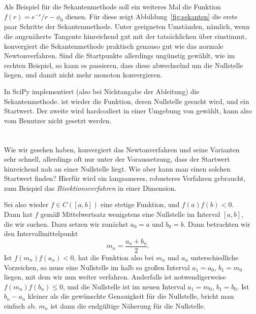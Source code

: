 Als Beispiel für die Sekantenmethode soll ein weiteres Mal die
Funktion $f(r) = e^{-r}/r - \phi_0$ dienen. Für diese zeigt
Abbildung~\ref{fig:sekanten} die erste paar Schritte der
Sekantenmethode. Unter geeigneten Umständen, nämlich, wenn die
angenäherte Tangente hinreichend gut mit der tatsächlichen über
einstimmt, konvergiert die Sekantenmethode praktisch genauso gut wie
das normale Newtonverfahren. Sind die Startpunkte allerdings ungünstig
gewählt, wie im rechten Beispiel, so kann es passieren, dass diese
abwechselnd um die Nullstelle liegen, und damit nicht mehr monoton
konvergieren.

In SciPy implementiert  (also bei
Nichtangabe der Ableitung) die Sekantenmethode.  ist wieder
die Funktion, deren Nullstelle gesucht wird, und  ein
Startwert. Der zweite wird hardcodiert in einer Umgebung von 
gewählt, kann also vom Benutzer nicht gesetzt werden.

\section{}

Wie wir gesehen haben, konvergiert das Newtonverfahren und seine
Varianten sehr schnell, allerdings oft nur unter der Voraussetzung,
dass der Startwert hinreichend nah an einer Nullstelle liegt. Wie aber
kann man einen solchen Startwert finden? Hierfür wird ein langsameres,
robusteres Verfahren gebraucht, zum Beispiel das
\emph{Bisektionsverfahren} in einer Dimension.

Sei also wieder $f\in C([a,b])$ eine stetige Funktion, und
$f(a)f(b)<0$. Dann hat $f$ gemäß Mittelwertsatz wenigstens eine
Nullstelle im Interval $[a,b]$, die wir suchen. Dazu setzen wir
zunächst $a_0=a$ und $b_0=b$. Dann betrachten wir den
Intervallmittelpunkt
\begin{equation}
  m_{n} = \frac{a_n + b_n}{2}.
\end{equation}
Ist $f(m_n)f(a_n) < 0$, hat die Funktion also bei $m_n$ und $a_n$ unterschiedliche Vorzeichen, so
muss eine Nullstelle im halb so großen Interval $a_1=a_0$, $b_1=m_0$
liegen, mit dem wir nun weiter verfahren. Anderfalls ist
notwendigerweise $f(m_n)f(b_n)\le 0$, und die Nullstelle ist im neuen
Interval $a_1=m_0$, $b_1 = b_0$. Ist $b_n - a_n$ kleiner als die
gewünschte Genauigkeit für die Nullstelle, bricht man einfach
ab. $m_n$ ist dann die endgültige Näherung für die Nullstelle.

